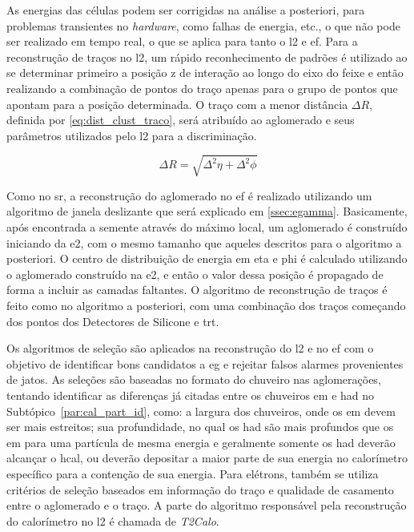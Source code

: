 As energias das células podem ser corrigidas na análise a posteriori, para
problemas transientes no \emph{hardware}, como falhas de energia, etc., o que não
pode ser realizado em tempo real, o que se aplica para tanto o \gls{l2} e
\gls{ef}. Para a reconstrução de traços no \gls{l2}, um rápido reconhecimento de
padrões é utilizado ao se determinar primeiro a posição z de interação ao longo
do eixo do feixe e então realizando a combinação de pontos do traço apenas para o grupo
de pontos que apontam para a posição determinada. O traço com a menor distância
$\Delta R$, definida por \ref{eq:dist_clust_traco}, será atribuído ao
aglomerado e seus parâmetros utilizados pelo \gls{l2} para a discriminação.

\begin{equation}\label{eq:dist_clust_traco}
\Delta R = \sqrt{\Delta^2\eta+\Delta^2\phi}
\end{equation}

Como no \gls{sr}, a reconstrução do aglomerado no \gls{ef} é realizado
utilizando um algoritmo de janela deslizante que será
explicado em \ref{ssec:egamma}. Basicamente, após encontrada
a semente através do máximo local, um aglomerado é construído iniciando da \gls{e2},
com o mesmo tamanho que aqueles descritos para o algoritmo a posteriori. O
centro de distribuição de energia em \gls{eta} e \gls{phi} é calculado
utilizando o aglomerado construído na \gls{e2}, e então o valor dessa
posição é propagado de forma a incluir as camadas faltantes. O algoritmo
de reconstrução de traços é feito como no algoritmo a posteriori, com uma
combinação dos traços começando dos pontos dos Detectores de Silicone e
\gls{trt}.

Os algoritmos de seleção são aplicados na reconstrução do
\gls{l2} e no \gls{ef} com o objetivo de identificar bons candidatos a \gls{eg}
e rejeitar falsos alarmes provenientes de jatos. As seleções são baseadas no
formato do chuveiro nas aglomerações, tentando identificar as diferenças já
citadas entre os chuveiros \gls{em} e \gls{had} no
Subtópico~\ref{par:cal_part_id}, como: a largura dos chuveiros, onde os \gls{em}
devem ser mais estreitos; sua profundidade, no qual os \gls{had} são mais
profundos que os \gls{em} para uma partícula de mesma energia e geralmente
somente os \gls{had} deverão alcançar o \gls{hcal}, ou deverão
depositar a maior parte de sua energia no calorímetro específico para a
contenção de sua energia. Para elétrons, também se utiliza critérios de seleção 
baseados em informação do traço e qualidade de casamento entre o aglomerado e o
traço. A parte do algoritmo responsável pela reconstrução do calorímetro no
\gls{l2} é chamada de \emph{T2Calo}.

